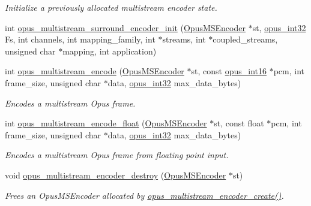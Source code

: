 \begin{DoxyCompactItemize}
\begin{DoxyCompactList}\small\item\em Initialize a previously allocated multistream encoder state. \end{DoxyCompactList}\item 
int \hyperlink{group__opus__multistream_ga993bfbae18b2dbfd641e50e51cef4484}{opus\+\_\+multistream\+\_\+surround\+\_\+encoder\+\_\+init} (\hyperlink{group__opus__multistream_gae5826674d142fc873ebc1d781c507dd7}{Opus\+M\+S\+Encoder} $\ast$st, \hyperlink{opus__types_8h_aa4d309d6f80b99dbabebc8f98879ab9a}{opus\+\_\+int32} Fs, int channels, int mapping\+\_\+family, int $\ast$streams, int $\ast$coupled\+\_\+streams, unsigned char $\ast$mapping, int application)
\item 
int \hyperlink{group__opus__multistream_ga9e1000f220d9872e9f3b6e4f2417b445}{opus\+\_\+multistream\+\_\+encode} (\hyperlink{group__opus__multistream_gae5826674d142fc873ebc1d781c507dd7}{Opus\+M\+S\+Encoder} $\ast$st, const \hyperlink{opus__types_8h_acc9ed7cf60479eb81f9648c6ec27dc26}{opus\+\_\+int16} $\ast$pcm, int frame\+\_\+size, unsigned char $\ast$data, \hyperlink{opus__types_8h_aa4d309d6f80b99dbabebc8f98879ab9a}{opus\+\_\+int32} max\+\_\+data\+\_\+bytes)
\begin{DoxyCompactList}\small\item\em Encodes a multistream Opus frame. \end{DoxyCompactList}\item 
int \hyperlink{group__opus__multistream_gaff832211e572536941b9d6094f9f42ce}{opus\+\_\+multistream\+\_\+encode\+\_\+float} (\hyperlink{group__opus__multistream_gae5826674d142fc873ebc1d781c507dd7}{Opus\+M\+S\+Encoder} $\ast$st, const float $\ast$pcm, int frame\+\_\+size, unsigned char $\ast$data, \hyperlink{opus__types_8h_aa4d309d6f80b99dbabebc8f98879ab9a}{opus\+\_\+int32} max\+\_\+data\+\_\+bytes)
\begin{DoxyCompactList}\small\item\em Encodes a multistream Opus frame from floating point input. \end{DoxyCompactList}\item 
void \hyperlink{group__opus__multistream_gaec819b8d4b38350aba6959cee7d33f94}{opus\+\_\+multistream\+\_\+encoder\+\_\+destroy} (\hyperlink{group__opus__multistream_gae5826674d142fc873ebc1d781c507dd7}{Opus\+M\+S\+Encoder} $\ast$st)
\begin{DoxyCompactList}\small\item\em Frees an {\ttfamily Opus\+M\+S\+Encoder} allocated by \hyperlink{group__opus__multistream_gaeb64c648ed8155f824ca8d9a93ccecae}{opus\+\_\+multistream\+\_\+encoder\+\_\+create()}. \end{DoxyCompactList}\item 

\end{DoxyCompactItemize}
